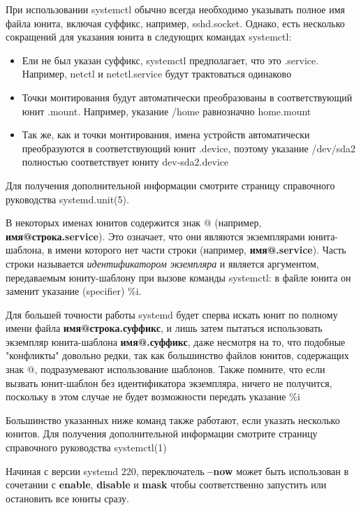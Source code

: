 \documentclass[a4paper,10pt,twoside]{article}
\begin{document}
При использовании systemctl обычно всегда необходимо указывать полное имя файла юнита, включая суффикс, например, sshd.socket. Однако, есть несколько сокращений для указания юнита в следующих командах systemctl:

\begin{itemize}
 \item Ели не был указан суффикс, systemctl предполагает, что это .service. Например, netctl и netctl.service будут трактоваться одинаково
\item Точки монтирования будут автоматически преобразованы в соответствующий юнит .mount. Например, указание /home равнозначно home.mount
\item Так же, как и точки монтирования, имена устройств автоматически преобразуются в соответствующий юнит .device, поэтому указание /dev/sda2 полностью соответствует юниту dev-sda2.device
\end{itemize}

Для получения дополнительной информации смотрите страницу справочного руководства systemd.unit(5).

 В некоторых именах юнитов содержится знак @ (например, \textbf{имя@строка.service}). Это означает, что они являются экземплярами юнита-шаблона, в имени которого нет части строки (например, \textbf{имя@.service}). Часть строки называется \textit{идентификатором экземпляра} и является аргументом, передаваемым юниту-шаблону при вызове команды systemctl: в файле юнита он заменит указание (specifier) \%i.

Для большей точности работы systemd будет сперва искать юнит по полному имени файла \textbf{имя@строка.суффикс}, и лишь затем пытаться использовать экземпляр юнита-шаблона \textbf{имя@.суффикс}, даже несмотря на то, что подобные "конфликты" довольно редки, так как большинство файлов юнитов, содержащих знак @, подразумевают использование шаблонов. Также помните, что если вызвать юнит-шаблон без идентификатора экземпляра, ничего не получится, поскольку в этом случае не будет возможности передать указание \%i

Большинство указанных ниже команд также работают, если указать несколько юнитов. Для получения дополнительной информации смотрите страницу справочного руководства systemctl(1)

Начиная с версии systemd 220, переключатель \textbf{--now} может быть использован в сочетании с \textbf{enable}, \textbf{disable} и \textbf{mask} чтобы соответственно запустить или остановить все юниты сразу.
\end{document}

